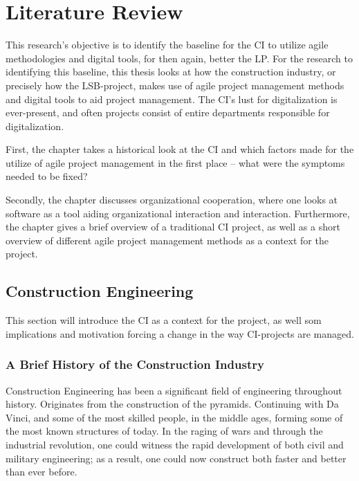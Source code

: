 
\chapter{Literature Review} \label{chp:litterature} 
This research's objective is to identify the baseline for the CI to utilize agile methodologies and digital tools, for then again, better the LP. For the research to identifying this baseline, this thesis looks at how the construction industry, or precisely how the LSB-project, makes use of agile project management methods and digital tools to aid project management. The CI's lust for digitalization is ever-present, and often projects consist of entire departments responsible for digitalization.

First, the chapter takes a historical look at the CI and which factors made for the utilize of agile project management in the first place – what were the symptoms needed to be fixed?

Secondly, the chapter discusses organizational cooperation, where one looks at software as a tool aiding organizational interaction and interaction. Furthermore, the chapter gives a brief overview of a traditional CI project, as well as a short overview of different agile project management methods as a context for the project.

\section{Construction Engineering}
This section will introduce the CI as a context for the project, as well som implications and motivation forcing a change in the way CI-projects are managed. 

\subsection{A Brief History of the Construction Industry}
Construction Engineering has been a significant field of engineering throughout history. Originates from the construction of the pyramids. Continuing with Da Vinci, and some of the most skilled people, in the middle ages, forming some of the most known structures of today. In the raging of wars and through the industrial revolution, one could witness the rapid development of both civil and military engineering; as a result, one could now construct both faster and better than ever before.

